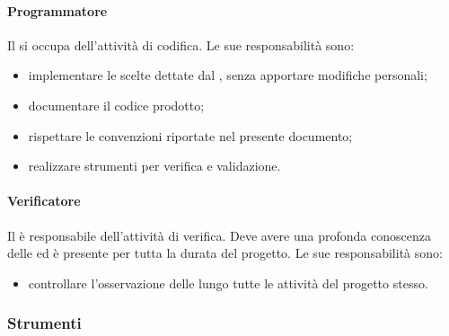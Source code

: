 			\paragraph{Programmatore}
			Il \programmatore{} si occupa dell'attività di codifica. Le sue responsabilità sono:
			\begin{itemize}
				\item implementare le scelte dettate dal \progettista{}, senza apportare modifiche personali;
				\item documentare il codice prodotto;
				\item rispettare le convenzioni riportate nel presente documento;
				\item realizzare strumenti per verifica e validazione.
			\end{itemize}
			\paragraph{Verificatore}
			Il \verificatore{} è responsabile dell'attività di verifica. Deve avere una profonda conoscenza delle \ndp{} ed è presente per tutta la durata del progetto. Le sue responsabilità sono:
			\begin{itemize}
				\item controllare l'osservazione delle \ndp{} lungo tutte le attività del progetto stesso.
			\end{itemize}
		\subsubsection{Strumenti}
